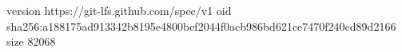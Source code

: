 version https://git-lfs.github.com/spec/v1
oid sha256:a188175ad913342b8195e4800bef2044f0acb986bd621ce7470f240cd89d2166
size 82068
